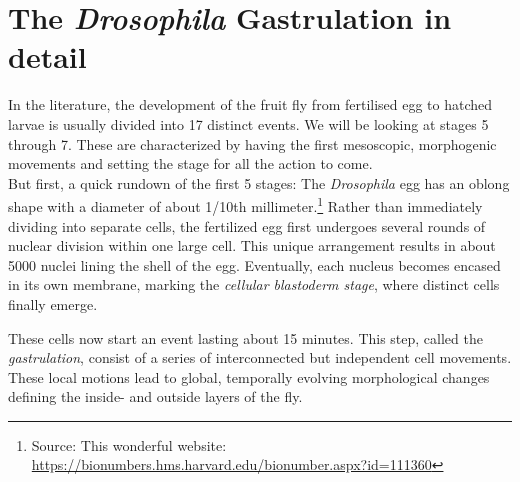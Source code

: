 


\newpage
\section{The \textit{Drosophila} Gastrulation in detail}
In the literature, the development of the fruit fly from fertilised egg to hatched larvae is usually divided into 17 distinct events.\cite{bownes1975photographic} We will be looking at stages 5 through 7. These are characterized by having the first mesoscopic, morphogenic movements and setting the stage for all the action to come. \\

But first, a quick rundown of the first 5 stages:
The \textit{Drosophila} egg has an oblong shape with a diameter of about 1/10th millimeter.\footnote{Source: This wonderful website: \url{https://bionumbers.hms.harvard.edu/bionumber.aspx?id=111360}} 
Rather than immediately dividing into separate cells, the fertilized egg first undergoes several rounds of nuclear division within one large cell. This unique arrangement results in about 5000 nuclei lining the shell of the egg. Eventually, each nucleus becomes encased in its own membrane, marking the \textit{cellular blastoderm stage}, where distinct cells finally emerge.



These cells now start an event lasting about 15 minutes. This step, called the \textit{gastrulation}, consist of a series of interconnected but independent cell movements. These local motions lead to global, temporally evolving morphological changes defining the inside- and outside layers of the fly.  \\

